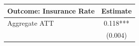 \begin{tabular}{lc}
\toprule
\textbf{Outcome: Insurance Rate} & \textbf{Estimate} \\
\midrule
Aggregate ATT & 0.118*** \\
& (0.004) \\
\bottomrule
\end{tabular}
